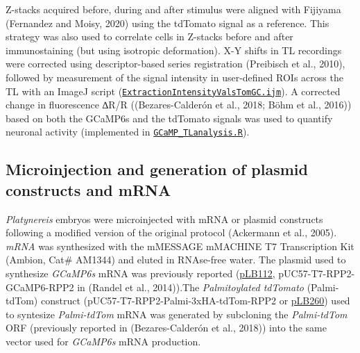 \documentclass[
  11pt,
]{article}
\begin{document}
Z-stacks acquired before, during and after stimulus were aligned with
Fijiyama (Fernandez and Moisy, 2020) using the tdTomato signal as a
reference. This strategy was also used to correlate cells in Z-stacks
before and after immunostaining (but using isotropic deformation). X-Y
shifts in TL recordings were corrected using descriptor-based series
registration (Preibisch et al., 2010), followed by measurement of the
signal intensity in user-defined ROIs across the TL with an ImageJ
script
(\href{https://github.com/JekelyLab/Bezares_et_al_2023_Pressure/blob/main/Code/CaImaging/ExtractionIntensityValsTomGC.ijm}{\texttt{ExtractionIntensityValsTomGC.ijm}}).
A corrected change in fluorescence ∆R/R ((Bezares-Calderón et al., 2018;
Böhm et al., 2016)) based on both the GCaMP6s and the tdTomato signals
was used to quantify neuronal activity (implemented in
\href{https://github.com/JekelyLab/Bezares_et_al_2023_Pressure/blob/main/Code/CaImaging/GCaMP_TLanalysis.R}{\texttt{GCaMP\_TLanalysis.R}}).

\subsection{Microinjection and generation of plasmid constructs and
mRNA}\label{microinjection-and-generation-of-plasmid-constructs-and-mrna}

\emph{Platynereis} embryos were microinjected with mRNA or plasmid
constructs following a modified version of the original protocol
(Ackermann et al., 2005). \emph{mRNA} was synthesized with the mMESSAGE
mMACHINE T7 Transcription Kit (Ambion, Cat\# AM1344) and eluted in
RNAse-free water. The plasmid used to synthesize \emph{GCaMP6s} mRNA was
previously reported
(\href{https://benchling.com/jekelylab/f/lib_sdvdcR5P-plasmidsstock_lbdb_jekelylab/seq_HRSlbW3F-puc57-t7-rpp25utr-gcamp6sasci-agei_c1/edit}{pLB112},
pUC57-T7-RPP2-GCaMP6-RPP2 in (Randel et al., 2014)).The
\emph{Palmitoylated tdTomato} (Palmi-tdTom) construct
(pUC57-T7-RPP2-Palmi-3xHA-tdTom-RPP2 or
\href{https://benchling.com/jekelylab/f/lib_sdvdcR5P-plasmidsstock_lbdb_jekelylab/seq_KpQNaGLw-plb260/edit}{pLB260})
used to syntesize \emph{Palmi-tdTom} mRNA was generated by subcloning
the \emph{Palmi-tdTom} ORF (previously reported in (Bezares-Calderón et
al., 2018)) into the same vector used for \emph{GCaMP6s} mRNA
production.
\end{document}
